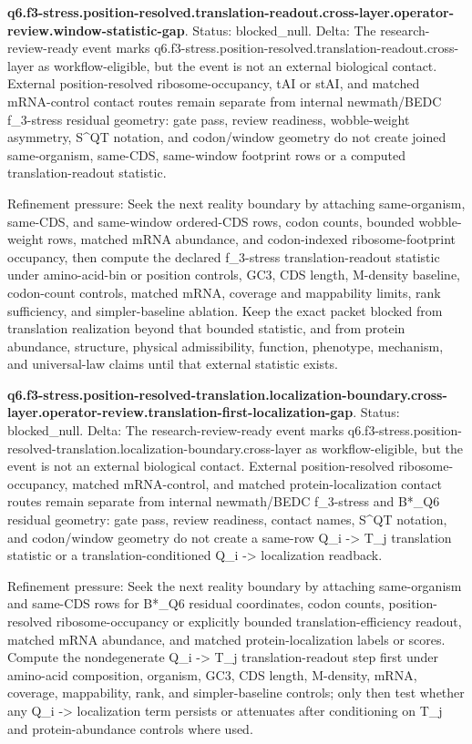\textbf{q6.f3-stress.position-resolved.translation-readout.cross-layer.operator-review.window-statistic-gap}. Status: blocked\_null. Delta: The research-review-ready event marks q6.f3-stress.position-resolved.translation-readout.cross-layer as workflow-eligible, but the event is not an external biological contact. External position-resolved ribosome-occupancy, tAI or stAI, and matched mRNA-control contact routes remain separate from internal newmath/BEDC f\_3-stress residual geometry: gate pass, review readiness, wobble-weight asymmetry, S\textasciicircum{}QT notation, and codon/window geometry do not create joined same-organism, same-CDS, same-window footprint rows or a computed translation-readout statistic.

Refinement pressure: Seek the next reality boundary by attaching same-organism, same-CDS, and same-window ordered-CDS rows, codon counts, bounded wobble-weight rows, matched mRNA abundance, and codon-indexed ribosome-footprint occupancy, then compute the declared f\_3-stress translation-readout statistic under amino-acid-bin or position controls, GC3, CDS length, M-density baseline, codon-count controls, matched mRNA, coverage and mappability limits, rank sufficiency, and simpler-baseline ablation. Keep the exact packet blocked from translation realization beyond that bounded statistic, and from protein abundance, structure, physical admissibility, function, phenotype, mechanism, and universal-law claims until that external statistic exists.

\textbf{q6.f3-stress.position-resolved-translation.localization-boundary.cross-layer.operator-review.translation-first-localization-gap}. Status: blocked\_null. Delta: The research-review-ready event marks q6.f3-stress.position-resolved-translation.localization-boundary.cross-layer as workflow-eligible, but the event is not an external biological contact. External position-resolved ribosome-occupancy, matched mRNA-control, and matched protein-localization contact routes remain separate from internal newmath/BEDC f\_3-stress and B*\_Q6 residual geometry: gate pass, review readiness, contact names, S\textasciicircum{}QT notation, and codon/window geometry do not create a same-row Q\_i -> T\_j translation statistic or a translation-conditioned Q\_i -> localization readback.

Refinement pressure: Seek the next reality boundary by attaching same-organism and same-CDS rows for B*\_Q6 residual coordinates, codon counts, position-resolved ribosome-occupancy or explicitly bounded translation-efficiency readout, matched mRNA abundance, and matched protein-localization labels or scores. Compute the nondegenerate Q\_i -> T\_j translation-readout step first under amino-acid composition, organism, GC3, CDS length, M-density, mRNA, coverage, mappability, rank, and simpler-baseline controls; only then test whether any Q\_i -> localization term persists or attenuates after conditioning on T\_j and protein-abundance controls where used.

